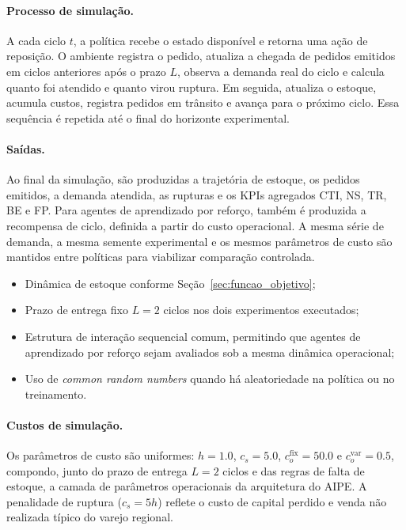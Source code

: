 \paragraph{Processo de simulação.}
A cada ciclo $t$, a política recebe o estado disponível e retorna uma ação de reposição. O ambiente registra o pedido, atualiza a chegada de pedidos emitidos em ciclos anteriores após o prazo $L$, observa a demanda real do ciclo e calcula quanto foi atendido e quanto virou ruptura. Em seguida, atualiza o estoque, acumula custos, registra pedidos em trânsito e avança para o próximo ciclo. Essa sequência é repetida até o final do horizonte experimental.

\paragraph{Saídas.}
Ao final da simulação, são produzidas a trajetória de estoque, os pedidos emitidos, a demanda atendida, as rupturas e os KPIs agregados CTI, NS, TR, BE e FP. Para agentes de aprendizado por reforço, também é produzida a recompensa de ciclo, definida a partir do custo operacional. A mesma série de demanda, a mesma semente experimental e os mesmos parâmetros de custo são mantidos entre políticas para viabilizar comparação controlada.

\begin{itemize}
  \item Dinâmica de estoque conforme Seção~\ref{sec:funcao_objetivo};
  \item Prazo de entrega fixo $L=2$ ciclos nos dois experimentos executados;
  \item Estrutura de interação sequencial comum, permitindo que agentes de aprendizado por reforço sejam avaliados sob a mesma dinâmica operacional;
  \item Uso de \textit{common random numbers} quando há aleatoriedade na política ou no treinamento.
\end{itemize}

\paragraph{Custos de simulação.} Os parâmetros de custo são uniformes: $h = 1.0$, $c_s = 5.0$, $c_o^{\text{fix}} = 50.0$ e $c_o^{\text{var}} = 0.5$, compondo, junto do prazo de entrega $L=2$ ciclos e das regras de falta de estoque, a camada de parâmetros operacionais da arquitetura do AIPE. A penalidade de ruptura ($c_s = 5h$) reflete o custo de capital perdido e venda não realizada típico do varejo regional.

